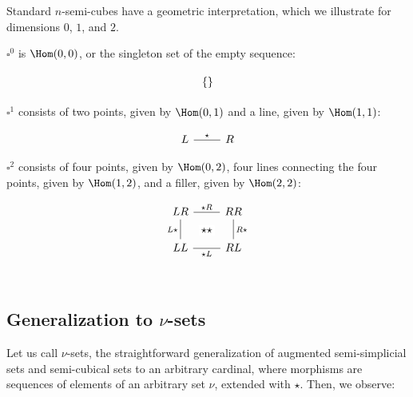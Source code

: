 \documentclass[10pt]{art.cls/art}
\newcommand{\Cube}{\ensuremath{\boldsymbol{\square}}}
\newcommand{\kstar}{{\star}}
\begin{document}
Standard $n$-semi-cubes have a geometric interpretation, which we illustrate for dimensions $0$, $1$, and $2$.

\begin{example}[$\Cube^0$]
  $\Cube^0$ is $\Hom(0, 0)$, or the singleton set of the empty sequence:

  \begin{equation*}
    \begin{tikzcd}
      \{\}
    \end{tikzcd}
  \end{equation*}
\end{example}

\begin{example}[$\Cube^1$]
  $\Cube^1$ consists of two points, given by $\Hom(0, 1)$ and a line, given by $\Hom(1, 1)$:

  \begin{equation*}
    \begin{tikzcd}
      L \arrow[r, "\kstar", dash] & R
    \end{tikzcd}
  \end{equation*}
\end{example}

\begin{example}[$\Cube^2$]
  $\Cube^2$ consists of four points, given by $\Hom(0, 2)$, four lines connecting the four points, given by $\Hom(1, 2)$, and a filler, given by $\Hom(2, 2)$:

  \begin{equation*}
    \begin{tikzcd}
      LR \arrow[r, dash, "\kstar R"{name=F}] \arrow[d, dash, "L\kstar" left] & RR \arrow[d, dash, "R\kstar"] \\
      LL \arrow[r, dash, "\kstar L"{name=T, below}] & RL \\
      \arrow[rightarrow, from=F, to=T, phantom, "\kstar\kstar" description]
    \end{tikzcd}
  \end{equation*}
\end{example}

\subsection{Generalization to \texorpdfstring{$\nu$}{ν}-sets}
Let us call $\nu$-sets, the straightforward generalization of augmented semi-simplicial sets and semi-cubical sets to an arbitrary cardinal, where morphisms are sequences of elements of an arbitrary set $\nu$, extended with $\kstar$. Then, we observe:
\end{document}
